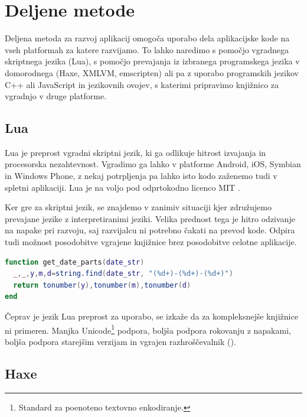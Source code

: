 \section{Deljene metode}

Deljena metoda za razvoj aplikacij omogoča uporabo dela aplikacijske kode na vseh platformah za katere razvijamo. To lahko naredimo s pomočjo vgradnega skriptnega jezika (Lua), s pomočjo prevajanja iz izbranega programskega jezika v domorodnega (Haxe, XMLVM, emscripten) ali pa z uporabo programskih jezikov C++ ali JavaScript in jezikovnih ovojev, s katerimi pripravimo knjižnico za vgradnjo v druge platforme.

\subsection{Lua}

Lua\cite{lua} je preprost vgradni skriptni jezik, ki ga odlikuje hitrost izvajanja in procesorska nezahtevnost. Vgradimo ga lahko v platforme Android, iOS, Symbian in Windows Phone, z nekaj potrpljenja pa lahko isto kodo zaženemo tudi v spletni aplikaciji. Lua je na voljo pod odprtokodno licenco MIT \cite{mit}.

Ker gre za skriptni jezik, se znajdemo v zanimiv situaciji kjer združujemo prevajane jezike z interpretiranimi jeziki. Velika prednost tega je hitro odzivanje na napake pri razvoju, saj razvijalcu ni potrebno čakati na prevod kode. Odpira tudi možnost posodobitve vgrajene knjižnice brez posodobitve celotne aplikacije.

\begin{lstlisting}[caption={Primer metode v skriptnem jeziku Lua, ki datum iz oblike 2014-07-14 razbije v leto, mesec in dan.}, label=code:lua, language=LUA]
function get_date_parts(date_str)
  _,_,y,m,d=string.find(date_str, "(%d+)-(%d+)-(%d+)")
  return tonumber(y),tonumber(m),tonumber(d)
end
\end{lstlisting}

Čeprav je jezik Lua preprost za uporabo, se izkaže da za kompleksnejše knjižnice ni primeren. Manjka Unicode\footnote{Standard za poenoteno textovno enkodiranje.} podpora, boljša podpora rokovanju z napakami, boljša podpora starejšim verzijam in vgrajen razhroščevalnik ().

\subsection{Haxe}


